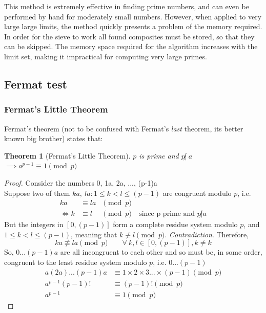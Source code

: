 \documentclass[12pt, titlepage]{article}
\newtheorem{theorem}{Theorem}
\begin{document}
    This method is extremely effective in finding prime numbers, and can even be performed
    by hand for moderately small numbers. However, when applied to very large large limits,
    the method quickly presents a problem of the memory required. In order for the sieve to
    work all found composites must be stored, so that they can be skipped. The memory space
    required for the algorithm increases with the limit set, making it impractical for
    computing very large primes.

           
    \subsection{Fermat test}
    \label{sec:fermat}

        \subsubsection{Fermat's Little Theorem}
        Fermat's theorem (not to be confused with Fermat's \emph{last} theorem, its better known
        big brother) states that:
        \begin{theorem}[Fermat's Little Theorem]
            $p$ is prime and $p \not|\ a$ $\implies a^{p-1} \equiv 1 \pmod{p}$
        \end{theorem}

        \begin{proof}
            Consider the numbers 0, 1a, 2a, ..., (p-1)a\\
            Suppose two of them $ka,\ la: 1\leq k < l \leq (p-1)$ are congruent modulo $p$, i.e.        %
            \begin{align*}
                      ka &\equiv la &\pmod{p}&\\
                \iff  k  &\equiv l  &\pmod{p}&\ \text{since p prime and $p \not| a$}
            \end{align*}
            But the integers in $[0, (p-1)]$ form a complete residue system modulo $p$, and  $1
            \leq k<l \leq (p-1)$, meaning that $k \not\equiv l \pmod p$. \emph{Contradiction}.
            Therefore,
            \begin{equation*}
                ka \not\equiv la \pmod{p}\qquad \forall\ k,l \in [0, (p-1)], k \not= k
            \end{equation*}
            So, $0...(p-1)a$ are all incongruent to each other and so must be, in some order,
            congruent to the least residue system modulo $p$, i.e.  $0...(p-1)$
            \begin{align*}
                a(2a)...(p-1)a &\equiv 1\times 2\times 3...\times (p-1) \pmod{p}\\
                a^{p-1}(p-1)!  &\equiv (p-1)!                           \pmod{p}\\
                a^{p-1}        &\equiv 1                                \pmod{p}
            \end{align*}
        \end{proof}
\end{document}
